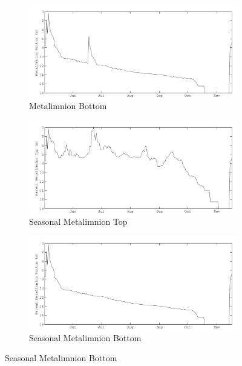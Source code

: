 \begin{figure}[!htb]
\begin{subfigure}{\lafigsize}
  \end{subfigure}
  \begin{subfigure}{\lafigsize}
    \caption{\label{fig:la:out:metaB}Metalimnion Bottom}
    \includegraphics[width = \linewidth]{figures/Sparkling_metaB.pdf}
  \end{subfigure}
  \begin{subfigure}{\lafigsize}
    \caption{\label{fig:la:out:SmetaT}Seasonal Metalimnion Top}
    \includegraphics[width = \linewidth]{figures/Sparkling_SmetaT.pdf}
  \end{subfigure}
  \begin{subfigure}{\lafigsize}
    \caption{\label{fig:la:out:SmetaB}Seasonal Metalimnion Bottom}
    \includegraphics[width = \linewidth]{figures/Sparkling_SmetaB.pdf}
  \end{subfigure}

\end{figure}
